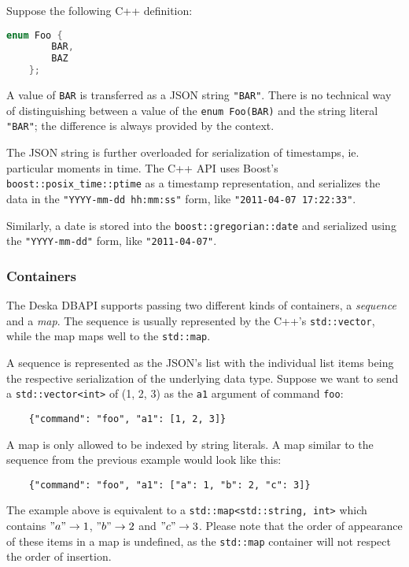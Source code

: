 \documentclass{article}
\begin{document}
Suppose the following C++ definition:

\begin{lstlisting}[language=c++]
    enum Foo {
        BAR,
        BAZ
    };
\end{lstlisting}

A value of {\tt BAR} is transferred as a JSON string {\tt "BAR"}.  There is no technical way of distinguishing between
a value of the {\tt enum Foo(BAR)} and the string literal {\tt "BAR"}; the difference is always provided by the
context.

The JSON string is further overloaded for serialization of timestamps, ie. particular moments in time.  The C++ API uses
Boost's {\tt boost::posix\_time::ptime} as a timestamp representation, and serializes the data in the {\tt "YYYY-mm-dd
hh:mm:ss"} form, like {\tt "2011-04-07 17:22:33"}.

Similarly, a date is stored into the {\tt boost::gregorian::date} and serialized using the {\tt "YYYY-mm-dd"} form, like
{\tt "2011-04-07"}.

\subsubsection{Containers}

The Deska DBAPI supports passing two different kinds of containers, a {\em sequence} and a {\em map}.  The sequence is
usually represented by the C++'s {\tt std::vector}, while the map maps well to the {\tt std::map}.

A sequence is represented as the JSON's list with the individual list items being the respective serialization of the
underlying data type. Suppose we want to send a {\tt std::vector<int>} of (1, 2, 3) as the {\tt a1} argument of command
{\tt foo}:

\begin{lstlisting}
    {"command": "foo", "a1": [1, 2, 3]}
\end{lstlisting}

A map is only allowed to be indexed by string literals. A map similar to the sequence from the previous example would
look like this:

\begin{lstlisting}
    {"command": "foo", "a1": ["a": 1, "b": 2, "c": 3]}
\end{lstlisting}

The example above is equivalent to a {\tt std::map<std::string, int>} which contains $"a" \rightarrow 1$, $"b"
\rightarrow 2$ and $"c" \rightarrow 3$.  Please note that the order of appearance of these items in a map is undefined,
as the {\tt std::map} container will not respect the order of insertion.
\end{document}
